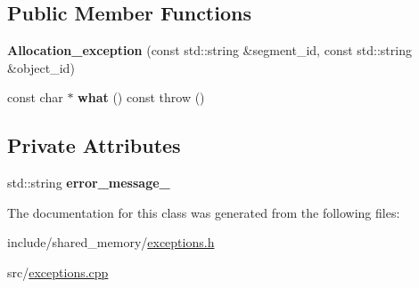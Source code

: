 \subsection*{Public Member Functions}
\begin{DoxyCompactItemize}
\item 
\mbox{\label{classshared__memory_1_1Allocation__exception_ac81ff8567ac6c6cec754fefc5fe79d12}} 
{\bfseries Allocation\+\_\+exception} (const std\+::string \&segment\+\_\+id, const std\+::string \&object\+\_\+id)
\item 
\mbox{\label{classshared__memory_1_1Allocation__exception_ace0c58eb354d14879430d339df72c889}} 
const char $\ast$ {\bfseries what} () const  throw ()
\end{DoxyCompactItemize}
\subsection*{Private Attributes}
\begin{DoxyCompactItemize}
\item 
\mbox{\label{classshared__memory_1_1Allocation__exception_a57a0e22bd60d77310cd67371a2294028}} 
std\+::string {\bfseries error\+\_\+message\+\_\+}
\end{DoxyCompactItemize}


The documentation for this class was generated from the following files\+:\begin{DoxyCompactItemize}
\item 
include/shared\+\_\+memory/\hyperlink{exceptions_8h}{exceptions.\+h}\item 
src/\hyperlink{exceptions_8cpp}{exceptions.\+cpp}\end{DoxyCompactItemize}

